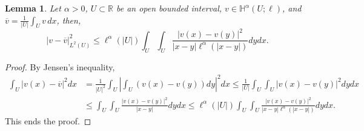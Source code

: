 \documentclass[11 pt]{article}
\newtheorem{lemma}[theorem]{Lemma}
\numberwithin{equation}{section}
\def\R{\mathbb{R}}
\begin{document}
\begin{lemma}\label{lem:poincare_type_weight}
Let $\alpha>0$, $U\subset \R$ be an open bounded interval, $v\in \mathbb H^{\alpha}(U;\ell)$, and $\overline v=\frac{1}{|U|}\int_{U}v\, dx$, then,
%
\begin{equation*}
    |v-\overline{v}|_{L^2(U)}^2\leq \ell^{\alpha}(|U|)\int_{U}\int_{U}\frac{|v(x)-v(y)|^2}{|x-y|\ell^{\alpha}(|x-y|)}dy dx.
\end{equation*}
%
\end{lemma}
%
\begin{proof}
By Jensen's inequality,
%
\begin{align*}
    \int_{U}|v(x)-\overline{v}|^2dx
    &=\frac{1}{|U|^2}\int_{U}\left|\int_{U}(v(x)-v(y))dy\right|^2dx \leq \frac{1}{|U|}\int_{U}\int_{U}|v(x)-v(y)|^2dy dx\\
&\leq \int_{U}\int_{U}\frac{|v(x)-v(y)|^2}{|x-y|}dy dx \leq \ell^{\alpha}(|U|)\int_{U}\int_{U}\frac{|v(x)-v(y)|^2}{|x-y|\ell^{\alpha}(|x-y|)}dy dx.
\end{align*}
%
This ends the proof. 
\end{proof}
\end{document}
